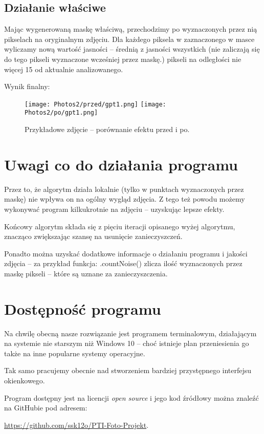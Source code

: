 \documentclass[]{mwart}
\begin{document}
\newpage
\subsection{Działanie właściwe}
Mając wygenerowaną maskę właściwą, przechodzimy po wyznaczonych
przez nią pikselach na oryginalnym zdjęciu. Dla każdego piksela w
zaznaczonego w masce wyliczamy nową wartość jasności -- średnią z
jasności wszystkich (nie zaliczają się do tego pikseli wyznaczone
wcześniej przez maskę.) pikseli na odległości nie więcej 15 od aktualnie analizowanego.

Wynik finalny:
\begin{figure}[H]
    \centering
    \texttt{[image: Photos2/przed/gpt1.png]}
    \texttt{[image: Photos2/po/gpt1.png]}
    \caption{Przykładowe zdjęcie -- porównanie efektu przed i po.}

\end{figure}

\newpage
\section{Uwagi co do działania programu}
Przez to, że algorytm działa lokalnie (tylko w punktach wyznaczonych
przez maskę) nie wpływa on na ogólny wygląd zdjęcia.
Z tego też powodu możemy wykonywać program kilkukrotnie na zdjęciu
-- uzyskując lepsze efekty.

Końcowy algorytm składa się z pięciu iteracji opisanego wyżej algorytmu,
znacząco zwiększając szansę na usunięcie zanieczyszczeń.

Ponadto można uzyskać dodatkowe informacje o działaniu programu
i jakości zdjęcia -- za przykład funkcja: .countNoise()
zlicza ilość wyznaczonych przez maskę pikseli -- które są uznane za zanieczyszczenia.





\section{Dostępność programu}
Na chwilę obecną nasze rozwiązanie jest programem terminalowym,
działającym na systemie nie starszym niż Windows 10 -- choć istnieje
plan przeniesienia go także na inne popularne systemy operacyjne.

Tak samo pracujemy obecnie nad stworzeniem bardziej przystępnego interfejsu okienkowego.

Program dostępny jest na licencji \textit{open source} i jego kod źródłowy można znaleźć na GitHubie
pod adresem:
\begin{center}
    \url{https://github.com/ssk12o/PTI-Foto-Projekt}.
\end{center}
\end{document}
